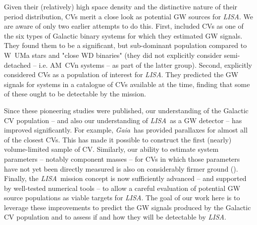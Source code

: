 \documentclass[fleqn,usenatbib]{mnras}
\newcommand{\lisa}{{\it LISA}}
\newcommand{\gaia}{{\it Gaia}}
\begin{document}
Given their (relatively) high space density and the distinctive nature of their period distribution, CVs merit a close look as potential GW sources for \lisa. We are aware of only two earlier attempts to do this. First, \cite{HBW90} included CVs as one of the six types of Galactic binary systems for which they estimated GW signals. They found them to be a significant, but sub-dominant population compared to W~UMa stars and "close WD binaries" (they did not explicitly consider semi-detached -- i.e. AM~CVn systems -- as part of the latter group). Second, \cite{MAA00} explicitly considered CVs as a population of interest for \lisa. They predicted the GW signals for systems in a catalogue of CVs available at the time, finding that some of these ought to be detectable by the mission. 

Since these pioneering studies were published, our understanding of the Galactic CV population -- and also our understanding of \lisa\ as a GW detector -- has improved significantly. For example, \gaia\ has provided parallaxes for almost all of the closest CVs. This has made it possible to construct the first (nearly) volume-limited sample of CV. Similarly, our ability to estimate system parameters -- notably component masses -- for CVs in which those parameters have not yet been directly measured is also on considerably firmer ground (\citealt{knigge06,knigge11,savoury11,carter13}). Finally, the \lisa\ mission concept is now sufficiently advanced -- and supported by well-tested numerical tools -- to allow a careful evaluation of potential GW source populations as viable targets for \lisa. The goal of our work here is to leverage these improvements to predict the GW signals produced by the Galactic CV population and to assess if and how they will be detectable by \lisa.

\end{document}
